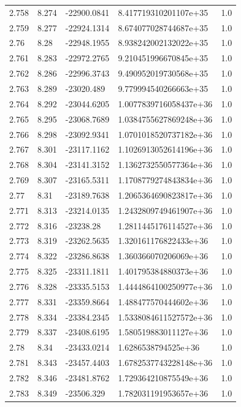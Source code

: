 \begin{tabular}{lllll}
2.758 & 8.274 & -22900.0841 & 8.417719310201107e+35 & 1.0 \\
2.759 & 8.277 & -22924.1314 & 8.674077028744687e+35 & 1.0 \\
2.76 & 8.28 & -22948.1955 & 8.938242002132022e+35 & 1.0 \\
2.761 & 8.283 & -22972.2765 & 9.210451996670845e+35 & 1.0 \\
2.762 & 8.286 & -22996.3743 & 9.490952019730568e+35 & 1.0 \\
2.763 & 8.289 & -23020.489 & 9.779994540266663e+35 & 1.0 \\
2.764 & 8.292 & -23044.6205 & 1.0077839716058437e+36 & 1.0 \\
2.765 & 8.295 & -23068.7689 & 1.0384755627869248e+36 & 1.0 \\
2.766 & 8.298 & -23092.9341 & 1.0701018520737182e+36 & 1.0 \\
2.767 & 8.301 & -23117.1162 & 1.1026913052614196e+36 & 1.0 \\
2.768 & 8.304 & -23141.3152 & 1.1362732550577364e+36 & 1.0 \\
2.769 & 8.307 & -23165.5311 & 1.1708779274843834e+36 & 1.0 \\
2.77 & 8.31 & -23189.7638 & 1.2065364690823817e+36 & 1.0 \\
2.771 & 8.313 & -23214.0135 & 1.2432809749461907e+36 & 1.0 \\
2.772 & 8.316 & -23238.28 & 1.2811445176114527e+36 & 1.0 \\
2.773 & 8.319 & -23262.5635 & 1.320161176822433e+36 & 1.0 \\
2.774 & 8.322 & -23286.8638 & 1.360366070206069e+36 & 1.0 \\
2.775 & 8.325 & -23311.1811 & 1.401795384880373e+36 & 1.0 \\
2.776 & 8.328 & -23335.5153 & 1.4444864100250977e+36 & 1.0 \\
2.777 & 8.331 & -23359.8664 & 1.488477570444602e+36 & 1.0 \\
2.778 & 8.334 & -23384.2345 & 1.5338084611527572e+36 & 1.0 \\
2.779 & 8.337 & -23408.6195 & 1.580519883011127e+36 & 1.0 \\
2.78 & 8.34 & -23433.0214 & 1.6286538794525e+36 & 1.0 \\
2.781 & 8.343 & -23457.4403 & 1.6782537743228148e+36 & 1.0 \\
2.782 & 8.346 & -23481.8762 & 1.729364210875549e+36 & 1.0 \\
2.783 & 8.349 & -23506.329 & 1.782031191953657e+36 & 1.0 \\

\end{tabular}

